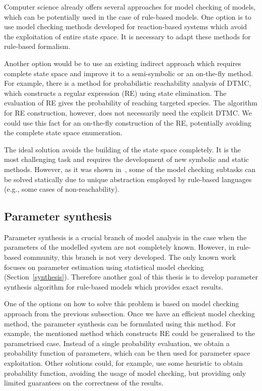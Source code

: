 \documentclass[11pt,a4paper]{report}
\begin{document}
Computer science already offers several approaches for model checking of models, which can be potentially used in the case of rule-based models. One option is to use model checking methods developed for reaction-based systems which avoid the exploitation of entire state space. It is necessary to adapt these methods for rule-based formalism.

Another option would be to use an existing indirect approach which requires complete state space and improve it to a semi-symbolic or an on-the-fly method. For example, there is a method for probabilistic reachability analysis of DTMC, which constructs a regular expression (RE) using state elimination. The evaluation of RE gives the probability of reaching targeted species. The algorithm for RE construction, however, does not necessarily need the explicit DTMC. We could use this fact for an on-the-fly construction of the RE, potentially avoiding the complete state space enumeration.

The ideal solution avoids the building of the state space completely. It is the most challenging task and requires the development of new symbolic and static methods. However, as it was shown in~\cite{trojak2018sasb}, some of the model checking subtasks can be solved statically due to unique abstraction employed by rule-based languages (e.g., some cases of non-reachability).

\subsection{Parameter synthesis}

Parameter synthesis is a crucial branch of model analysis in the case when the parameters of the modelled system are not completely known. However, in rule-based community, this branch is not very developed. The only known work focuses on parameter estimation using statistical model checking (Section~\ref{synthesis}). Therefore another goal of this thesis is to develop parameter synthesis algorithm for rule-based models which provides exact results.

One of the options on how to solve this problem is based on model checking approach from the previous subsection. Once we have an efficient model checking method, the parameter synthesis can be formulated using this method. For example, the mentioned method which constructs RE could be generalised to the parametrised case. Instead of a single probability evaluation, we obtain a probability function of parameters, which can be then used for parameter space exploitation. Other solutions could, for example, use some heuristic to obtain probability function, avoiding the usage of model checking, but providing only limited guarantees on the correctness of the results.
\end{document}
